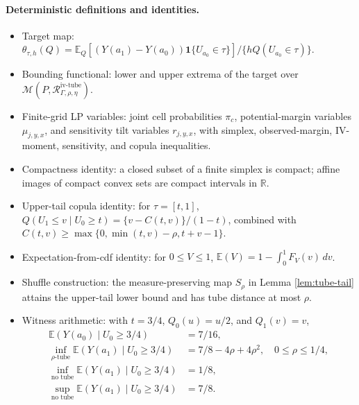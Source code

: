 \documentclass[11pt]{article}
\newcommand{\E}{\mathbb{E}}
\newcommand{\one}{\mathbf{1}}
\theoremstyle{definition}
\theoremstyle{plain}
\theoremstyle{remark}
\begin{document}
\paragraph{Deterministic definitions and identities.}
\begin{itemize}[leftmargin=*]
\item Target map: \(\theta_{\tau,h}(Q)=\E_Q[(Y(a_1)-Y(a_0))\one\{U_{a_0}\in\tau\}]/\{hQ(U_{a_0}\in\tau)\}\).
\item Bounding functional: lower and upper extrema of the target over \(\mathcal M(P,\mathcal R_{\Gamma,\rho,\eta}^{\mathrm{iv\text{-}tube}})\).
\item Finite-grid LP variables: joint cell probabilities \(\pi_c\), potential-margin variables \(\mu_{j,y,x}\), and sensitivity tilt variables \(r_{j,y,x}\), with simplex, observed-margin, IV-moment, sensitivity, and copula inequalities.
\item Compactness identity: a closed subset of a finite simplex is compact; affine images of compact convex sets are compact intervals in \(\mathbb R\).
\item Upper-tail copula identity: for \(\tau=[t,1]\), \(Q(U_1\le v\mid U_0\ge t)=\{v-C(t,v)\}/(1-t)\), combined with \(C(t,v)\ge\max\{0,\min(t,v)-\rho,t+v-1\}\).
\item Expectation-from-cdf identity: for \(0\le V\le1\), \(\E(V)=1-\int_0^1F_V(v)\,dv\).
\item Shuffle construction: the measure-preserving map \(S_\rho\) in Lemma \ref{lem:tube-tail} attains the upper-tail lower bound and has tube distance at most \(\rho\).
\item Witness arithmetic: with \(t=3/4\), \(Q_0(u)=u/2\), and \(Q_1(v)=v\),
\[
\begin{aligned}
\E(Y(a_0)\mid U_0\ge3/4)&=7/16,\\
\inf_{\rho\text{-tube}}\E(Y(a_1)\mid U_0\ge3/4)&=7/8-4\rho+4\rho^2,\quad 0\le\rho\le1/4,\\
\inf_{\text{no tube}}\E(Y(a_1)\mid U_0\ge3/4)&=1/8,\\
\sup_{\text{no tube}}\E(Y(a_1)\mid U_0\ge3/4)&=7/8.
\end{aligned}
\]
\end{itemize}
\end{document}
